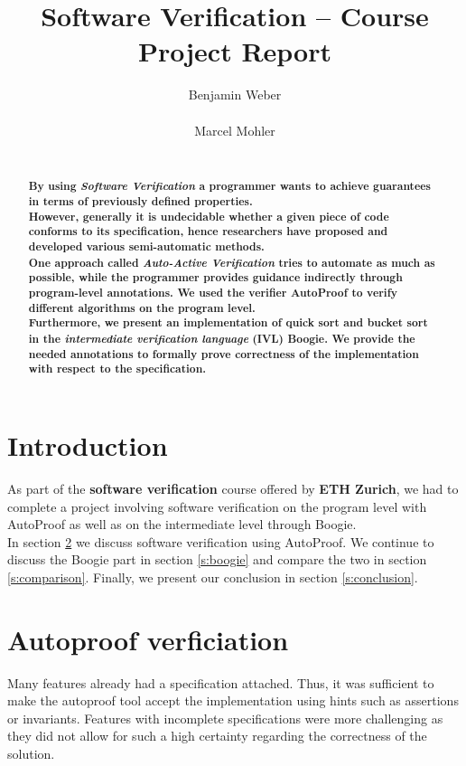 \documentclass{report}
\title{Software Verification -- Course Project Report}
\author{
%
%
\alignauthor Benjamin Weber\\
	\affaddr{ETH ID 11-933-017}\\
	\email{benweber@student.ethz.ch}
\alignauthor Marcel Mohler\\
	\affaddr{ETH ID 09-922-998}\\
	\email{mohlerm@student.ethz.ch}
}
\begin{document}
\maketitle

\begin{abstract}
\textbf{By using \textit{Software Verification} a programmer wants to achieve guarantees in terms of previously defined properties.\\
However, generally it is undecidable whether a given piece of code conforms to its specification, hence researchers have proposed and developed various semi-automatic methods.\\
One approach called \textit{Auto-Active Verification} tries to automate as much as possible, while the programmer provides guidance indirectly through program-level annotations\cite{tschannen2011verifying}\cite{autoactivelecture}.
We used the verifier AutoProof\cite{autoproof} to verify different algorithms on the program level. \\Furthermore, we present an implementation of quick sort\cite{quicksort} and bucket sort\cite{bucketsort} in the \textit{intermediate verification language} (IVL) Boogie\cite{barnett2006boogie}\cite{boogie}. We provide the needed annotations to formally prove correctness of the implementation with respect to the specification.
}
\end{abstract}

\section{Introduction}
\label{s:introduction}
As part of the \textbf{software verification} course offered by \textbf{ETH Zurich},
we had to complete a project involving software verification on the program
level with AutoProof as well as on the intermediate level through Boogie.\\
In section \ref{s:autoproof} we discuss software verification using AutoProof.
We continue to discuss the Boogie part in section \ref{s:boogie} and compare
the two in section \ref{s:comparison}. Finally, we present our conclusion in
section \ref{s:conclusion}.

\section{Autoproof verficiation}
\label{s:autoproof}

Many features already had a specification attached. Thus, it was sufficient to
make the autoproof tool accept the implementation using hints such as assertions
or invariants. Features with incomplete specifications were more challenging as
they did not allow for such a high certainty regarding the correctness of the
solution.
\end{document}
